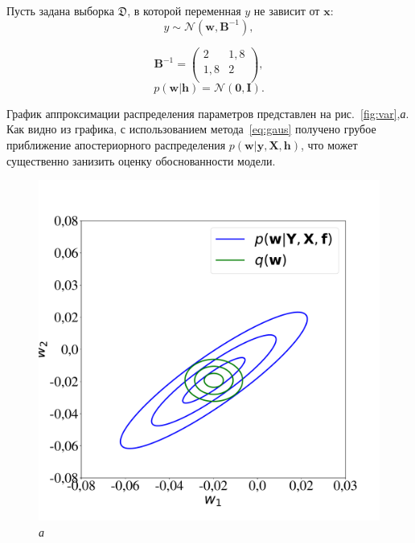 \begin{example}
Пусть  задана выборка $\mathfrak{D}$, в которой переменная ${y}$ не зависит от $\mathbf{x}$:
\begin{equation}
\label{eq:example_post}
	{y} \sim \mathcal{N}(\mathbf{w}, \mathbf{B}^{-1}),
\end{equation}

\[
	\mathbf{B}^{-1} = \left( \begin{array}{cc}
	2 & 1,8 \\
	1,8 & 2\\
	\end{array}  \right),
\]
\[
	p(\mathbf{w}|\mathbf{h}) = \mathcal{N}(\mathbf{0}, \mathbf{I}).
\]

График аппроксимации распределения параметров представлен на рис.~\ref{fig:var},\textit{а}. Как видно из графика, с использованием метода~\eqref{eq:gaus} получено грубое приближение апостериорного распределения $p(\mathbf{w}|\mathbf{y}, \mathbf{X}, \mathbf{h})$, что может существенно занизить оценку обоснованности модели.


\begin{figure}[tbh!]



 \caption*{\textit{а}}
  \includegraphics[width=\linewidth]{./plots/var/mf.pdf}


\end{figure}
\end{example}

